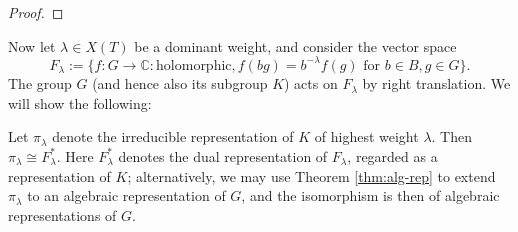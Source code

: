 \documentclass[reqno]{amsart} 
\begin{document}
\begin{proof}
\end{proof}

Now let $\lambda \in X(T)$ be a dominant weight, and consider the vector space
\begin{equation}\label{eq:}
  F_\lambda := \{f : G \rightarrow \mathbb{C} :
  \text{holomorphic},
  f(b g) = b^{-\lambda} f(g) \text{ for } b \in B, g \in G
  \}.
\end{equation}
The group $G$ (and hence also its subgroup $K$) acts on $F_\lambda$ by right translation.  We will show the following:
\begin{theorem}\label{thm:borel-weil-construction}
  Let $\pi_\lambda$ denote the irreducible representation of $K$ of highest weight $\lambda$.  Then $\pi_\lambda \cong F_\lambda^*$.  Here $F_\lambda^*$ denotes the dual representation of $F_\lambda$, regarded as a representation of $K$; alternatively, we may use Theorem \ref{thm:alg-rep} to extend $\pi_\lambda$ to an algebraic representation of $G$, and the isomorphism is then of algebraic representations of $G$.
\end{theorem}
\end{document}
